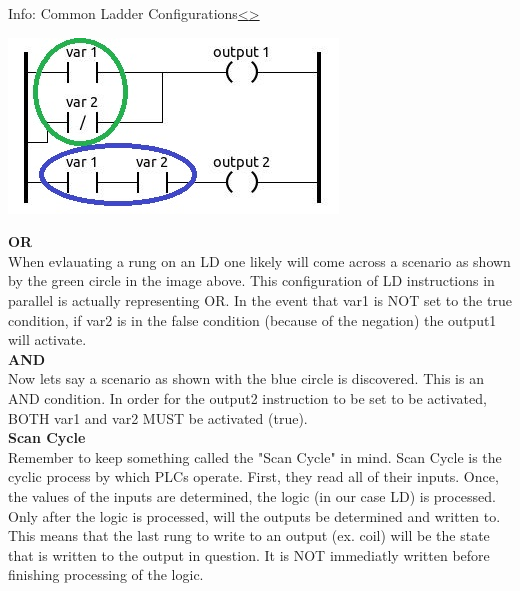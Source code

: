 \documentclass[12pt]{extarticle}
\newenvironment{instructionblock}{\Large\bgroup}{\egroup}
\newcounter{next}
\newcounter{prev}
\begin{document}
\pagebreak
{}
\begin{slide}{Info: Common Ladder Configurations}{\hyperref[slide \theprev]{\textless}\hyperref[slide \thenext]{\textgreater}}
	\begin{instructionblock}
		\begin{center}
			\includegraphics[scale=1.6]{Images/LadderDiagram05.JPG}
		\end{center}
	\end{instructionblock}
\end{slide}
\vfill
\noindent
\textbf{OR}\\
When evlauating a rung on an LD one likely will come across a scenario as shown by the green circle in the image above. This configuration of LD instructions in parallel is actually representing OR. In the event that var1 is NOT set to the true condition, if var2 is in the false condition (because of the negation) the output1 will activate.\\
\textbf{AND}\\
Now lets say a scenario as shown with the blue circle is discovered. This is an AND condition. In order for the output2 instruction to be set to be activated, BOTH var1 and var2 MUST be activated (true).\\
\textbf{Scan Cycle}\\
Remember to keep something called the "Scan Cycle" in mind. Scan Cycle is the cyclic process by which PLCs operate. First, they read all of their inputs. Once, the values of the inputs are determined, the logic (in our case LD) is processed. Only after the logic is processed, will the outputs be determined and written to. This means that the last rung to write to an output (ex. coil) will be the state that is written to the output in question. It is NOT immediatly written before finishing processing of the logic. \cite{PLC_acad}
\end{document}
